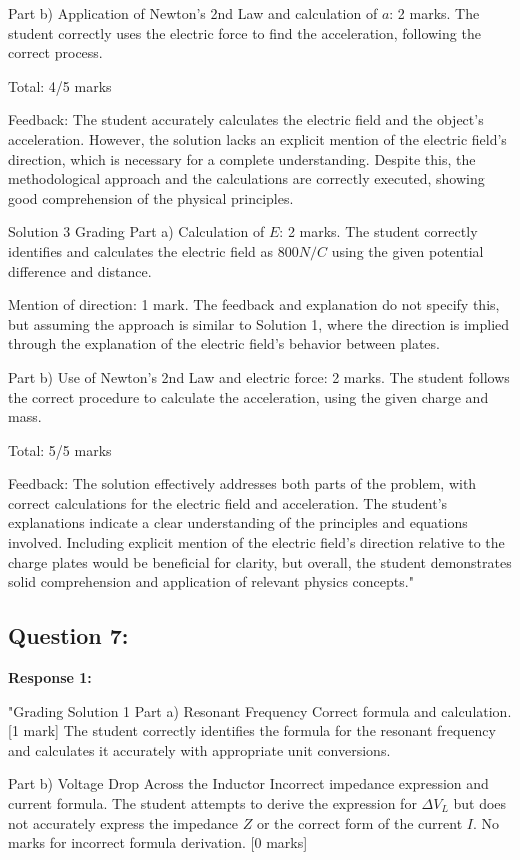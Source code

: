 \documentclass[a4paper,11pt]{article}
\begin{document}
Part b)
Application of Newton’s 2nd Law and calculation of \(a\): 2 marks. The student correctly uses the electric force to find the acceleration, following the correct process.

Total: 4/5 marks

Feedback:
The student accurately calculates the electric field and the object's acceleration. However, the solution lacks an explicit mention of the electric field's direction, which is necessary for a complete understanding. Despite this, the methodological approach and the calculations are correctly executed, showing good comprehension of the physical principles.

Solution 3 Grading
Part a)
Calculation of \(E\): 2 marks. The student correctly identifies and calculates the electric field as \(800 N/C\) using the given potential difference and distance.

Mention of direction: 1 mark. The feedback and explanation do not specify this, but assuming the approach is similar to Solution 1, where the direction is implied through the explanation of the electric field's behavior between plates.

Part b)
Use of Newton's 2nd Law and electric force: 2 marks. The student follows the correct procedure to calculate the acceleration, using the given charge and mass.

Total: 5/5 marks

Feedback:
The solution effectively addresses both parts of the problem, with correct calculations for the electric field and acceleration. The student's explanations indicate a clear understanding of the principles and equations involved. Including explicit mention of the electric field's direction relative to the charge plates would be beneficial for clarity, but overall, the student demonstrates solid comprehension and application of relevant physics concepts."

\subsection*{Question 7:}

\textbf{Response 1:}

"Grading Solution 1
Part a) Resonant Frequency
Correct formula and calculation. [1 mark] The student correctly identifies the formula for the resonant frequency and calculates it accurately with appropriate unit conversions.

Part b) Voltage Drop Across the Inductor
Incorrect impedance expression and current formula. The student attempts to derive the expression for \(\Delta V_L\) but does not accurately express the impedance \(Z\) or the correct form of the current \(I\). No marks for incorrect formula derivation. [0 marks]
\end{document}
